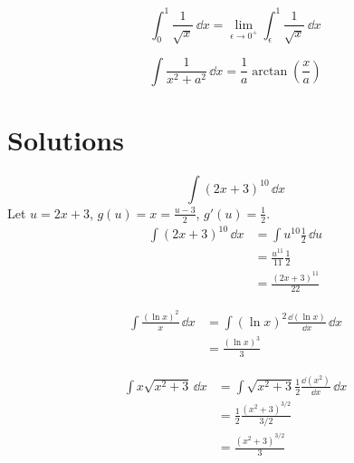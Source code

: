 \begin{Hint}
  \label{hint int 0 1 1 / sqrt x}
  \[
  \int_0^1 \frac{1}{\sqrt{x}} \,\dd x
  = \lim_{\epsilon \to 0^+} \int_\epsilon^1 \frac{1}{\sqrt{x}} \,\dd x 
  \]
\end{Hint}




\begin{Hint}
  \label{hint int 0 infty 1 / x2+4}
  \[
  \int \frac{1}{x^2 + a^2} \,\dd x = \frac{1}{a} \arctan \left( \frac{x}{a} \right)
  \]
\end{Hint}








\raggedbottom
\pagebreak
\flushbottom
\section{Solutions}





\begin{Solution}
  \label{solution int 2x+3 10}
  \[
  \int (2x+3)^{10} \,\dd x
  \]
  Let $u=2x+3$, $g(u) = x = \frac{u-3}{2}$, $g'(u) = \frac{1}{2}$.
  \begin{align*}
    \int (2x+3)^{10} \,\dd x
    &= \int u^{10} \frac{1}{2} \,\dd u \\
    &= \frac{u^{11}}{11} \frac{1}{2} \\
    &= \frac{(2x+3)^{11}}{22}
  \end{align*}
\end{Solution}



\begin{Solution}
  \label{solution int ln x 2 / x}
  \begin{align*}
    \int \frac{(\ln x)^2}{x} \,\dd x
    &= \int (\ln x)^2 \frac{\dd (\ln x)}{\dd x}\,\dd x \\
    &= \frac{(\ln x)^3}{3}
  \end{align*}
\end{Solution}



\begin{Solution}
  \label{solution int x sqrt x2+3}
  \begin{align*}
    \int x \sqrt{x^2 +3} \,\dd x
    &= \int \sqrt{x^2 + 3} \frac{1}{2} \frac{\dd (x^2)}{\dd x} \,\dd x \\
    &= \frac{1}{2} \frac{(x^2+3)^{3/2}}{3/2} \\
    &= \frac{(x^2+3)^{3/2}}{3}
  \end{align*}
\end{Solution}




